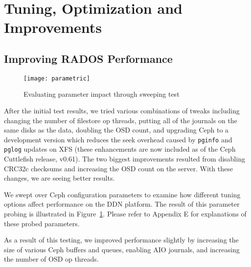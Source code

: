 \section{Tuning, Optimization and Improvements}
\label{sec:ceph-tuning}

\subsection{Improving RADOS Performance}

\begin{figure}[h]
\centering
\texttt{[image: parametric]}
\caption{Evaluating parameter impact through sweeping test}
\label{fig:parametric}
\end{figure}


After the initial test results, we tried various combinations of tweaks
including changing the number of filestore op threads, putting all of the
journals on the same disks as the data, doubling the OSD count, and upgrading
Ceph to a development version which reduces the seek overhead caused by
\texttt{pginfo} and \texttt{pglog} updates on XFS (these enhancements are now
included as of the Ceph Cuttlefish release, v0.61).  The two biggest
improvements resulted from disabling CRC32c checksums and increasing the OSD
count on the server.  With these changes, we are seeing better results.

We swept over Ceph configuration parameters to examine how different tuning
options affect performance on the DDN platform. The result of this parameter
probing is illustrated in Figure~\ref{fig:parametric}. Please refer to Appendix
E for explanations of these probed parameters.


As a result of this testing, we improved performance slightly by
increasing the size of various Ceph buffers and queues, enabling AIO journals,
and increasing the number of OSD op threads.


